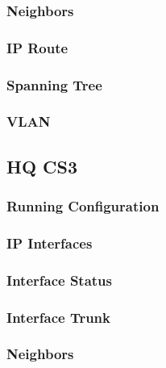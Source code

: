 \subsubsection{Neighbors}


\subsubsection{IP Route}


\subsubsection{Spanning Tree}


\subsubsection{VLAN}






\subsection{HQ CS3}
\subsubsection{Running Configuration}


\subsubsection{IP Interfaces}


\subsubsection{Interface Status}


\subsubsection{Interface Trunk}


\subsubsection{Neighbors}


